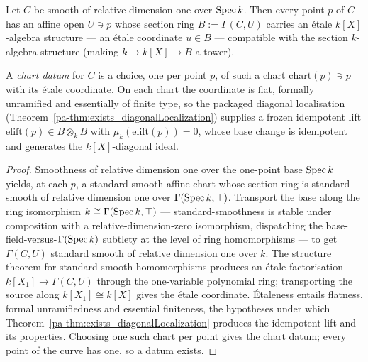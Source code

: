\begin{definition}
  \label{pa-def:diagonalChartData}
  \leanok

  Let \(C\) be smooth of relative dimension one over \(\operatorname{Spec} k\). Then every point \(p\) of \(C\)
  has an affine open \(U \ni p\) whose section ring \(B := \Gamma(C, U)\) carries an étale
  \(k[X]\)-algebra structure --- an étale coordinate \(u \in B\) --- compatible with the section
  \(k\)-algebra structure (making \(k \to k[X] \to B\) a tower).

  A \emph{chart datum} for \(C\) is a choice, one per point \(p\), of such a chart
  \(\mathrm{chart}(p) \ni p\) with its étale coordinate. On each chart the coordinate is flat,
  formally unramified and essentially of finite type, so the packaged diagonal localisation
  (Theorem~\ref{pa-thm:exists_diagonalLocalization}) supplies a frozen idempotent lift
  \(\mathrm{elift}(p) \in B \otimes_k B\) with \(\mu_k(\mathrm{elift}(p)) = 0\), whose base change
  is idempotent and generates the \(k[X]\)-diagonal ideal.
\end{definition}
\begin{proof}
  \leanok
  Smoothness of relative dimension one over the one-point base \(\operatorname{Spec} k\) yields, at each \(p\), a
  standard-smooth affine chart whose section ring is standard smooth of relative dimension one over
  \(\Gamma(\operatorname{Spec} k, \top)\). Transport the base along the ring isomorphism \(k \cong \Gamma(\operatorname{Spec}
  k, \top)\) --- standard-smoothness is stable under composition with a relative-dimension-zero
  isomorphism, dispatching the base-field-versus-\(\Gamma(\operatorname{Spec} k)\) subtlety at the level of ring
  homomorphisms --- to get \(\Gamma(C, U)\) standard smooth of relative dimension one over \(k\).
  The structure theorem for standard-smooth homomorphisms produces an étale factorisation
  \(k[X_1] \to \Gamma(C, U)\) through the one-variable polynomial ring; transporting the source
  along \(k[X_1] \cong k[X]\) gives the étale coordinate. Étaleness entails flatness, formal
  unramifiedness and essential finiteness, the hypotheses under which
  Theorem~\ref{pa-thm:exists_diagonalLocalization} produces the idempotent lift and its properties.
  Choosing one such chart per point gives the chart datum; every point of the curve has one, so a
  datum exists.
\end{proof}

